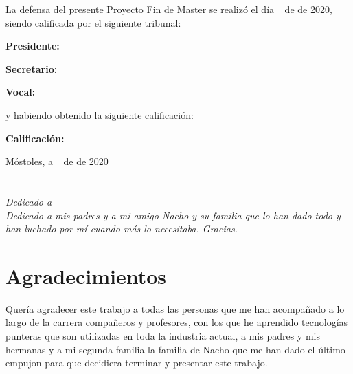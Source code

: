 \documentclass[a4paper, 17pt]{book}
\begin{document}
\vspace{1cm}
La defensa del presente Proyecto Fin de Master se realizó el día \qquad$\;\,$ de \qquad\qquad\qquad\qquad \newline de 2020, siendo calificada por el siguiente tribunal:


\vspace{0.5cm}
\textbf{Presidente:}

\vspace{1.2cm}
\textbf{Secretario:}

\vspace{1.2cm}
\textbf{Vocal:}


\vspace{1.2cm}
y habiendo obtenido la siguiente calificación:

\vspace{1cm}
\textbf{Calificación:}


\vspace{1cm}
\begin{flushright}
Móstoles, a \qquad$\;\,$ de \qquad\qquad\qquad\qquad de 2020
\end{flushright}


\chapter*{}
\begin{flushright}
\textit{Dedicado a \\
Dedicado a mis padres y a mi amigo Nacho y su familia que lo han dado todo y han luchado por mí cuando más lo necesitaba. Gracias.}
\end{flushright}


\chapter*{Agradecimientos}

Quería agradecer este trabajo a todas las personas que me han acompañado a lo largo de la 
carrera compañeros y profesores, con los que he aprendido tecnologías punteras que son 
utilizadas en toda la industria actual, a mis padres y mis hermanas y a mi segunda familia
la familia de Nacho que me han dado el último empujon para que decidiera terminar y 
presentar este trabajo.
\end{document}
